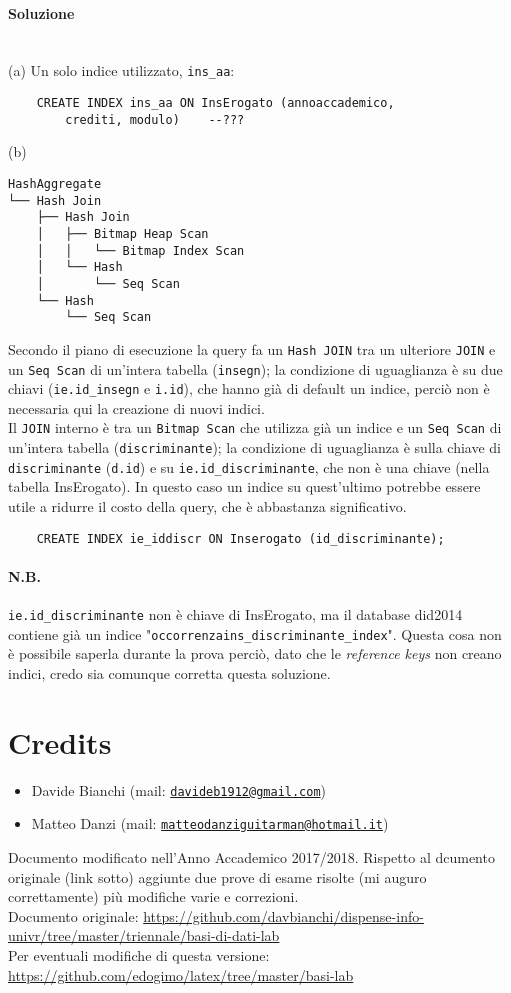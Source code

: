 \documentclass[a4paper, 10pt, titlepage]{article}
\newcommand{\mail}[1]{\href{mailto:#1}{\texttt{#1}}}
\begin{document}
\paragraph{Soluzione}\dotfill
\\(a) Un solo indice utilizzato, \lstinline|ins_aa|:
\begin{lstlisting}
	CREATE INDEX ins_aa ON InsErogato (annoaccademico, 
		crediti, modulo)	--???
\end{lstlisting}
(b) 
\begin{verbatim}
HashAggregate
└── Hash Join
    ├── Hash Join
    │   ├── Bitmap Heap Scan
    │   │   └── Bitmap Index Scan
    │   └── Hash
    │       └── Seq Scan
    └── Hash
        └── Seq Scan
\end{verbatim}
Secondo il piano di esecuzione la query fa un \lstinline|Hash JOIN| tra un ulteriore \lstinline|JOIN| e un \lstinline|Seq Scan| di un'intera tabella (\lstinline|insegn|); la condizione di uguaglianza è su due chiavi (\lstinline|ie.id_insegn| e \lstinline|i.id|), che hanno già di default un indice, perciò non è necessaria qui la creazione di nuovi indici.\\
Il \lstinline|JOIN| interno è tra un \lstinline|Bitmap Scan| che utilizza già un indice e un \lstinline|Seq Scan| di un'intera tabella (\lstinline|discriminante|); la condizione di uguaglianza è sulla chiave di \lstinline|discriminante| (\lstinline|d.id|) e su \lstinline|ie.id_discriminante|, che non è una chiave (nella tabella InsErogato). In questo caso un indice su quest'ultimo potrebbe essere utile a ridurre il costo della query, che è abbastanza significativo.
\begin{lstlisting}
	CREATE INDEX ie_iddiscr ON Inserogato (id_discriminante);
\end{lstlisting}
\paragraph{N.B.} \lstinline|ie.id_discriminante| non è chiave di InsErogato, ma il database did2014 contiene già un indice "\lstinline|occorrenzains_discriminante_index|". Questa cosa non è possibile saperla durante la prova perciò, dato che le \textit{reference keys} non creano indici, credo sia comunque corretta questa soluzione.
\newpage

\section{Credits}
\begin{itemize}
\item Davide Bianchi (mail: \mail{davideb1912@gmail.com})
\item Matteo Danzi (mail: \mail{matteodanziguitarman@hotmail.it})
\end{itemize}
Documento modificato nell'Anno Accademico 2017/2018. Rispetto al dcumento originale (link sotto) aggiunte due prove di esame risolte (mi auguro correttamente) più modifiche varie e correzioni. \medskip \\
{\scriptsize Documento originale: \url{https://github.com/davbianchi/dispense-info-univr/tree/master/triennale/basi-di-dati-lab}}\\
{\scriptsize Per eventuali modifiche di questa versione: \url{https://github.com/edogimo/latex/tree/master/basi-lab}}
			
\end{document}
